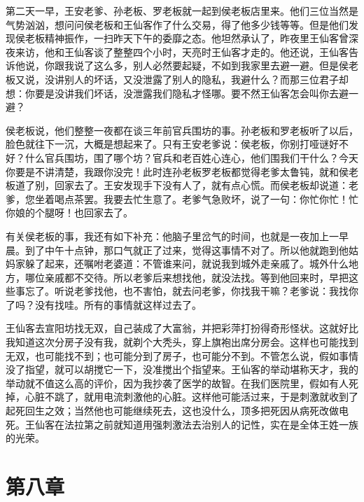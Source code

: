 第二天一早，王安老爹、孙老板、罗老板就一起到侯老板店里来。他们三位当然是气势汹汹，想问问侯老板和王仙客作了什么交易，得了他多少钱等等。但是他们发现侯老板精神振作，一扫昨天下午的委靡之态。他坦然承认了，昨夜里王仙客曾深夜来访，他和王仙客谈了整整四个小时，天亮时王仙客才走的。他还说，王仙客告诉他说，你跟我说了这么多，别人必然要起疑，不如到我家里去避一避。但是侯老板又说，没讲别人的坏话，又没泄露了别人的隐私，我避什么？而那三位君子却想：你要是没讲我们坏话，没泄露我们隐私才怪哪。要不然王仙客怎会叫你去避一避？ 

侯老板说，他们整整一夜都在谈三年前官兵围坊的事。孙老板和罗老板听了以后，脸色就往下一沉，大概是想起来了。只有王安老爹说：侯老板，你别打哑谜好不好？什么官兵围坊，围了哪个坊？官兵和老百姓心连心，他们围我们干什么？今天你要是不讲清楚，我跟你没完！此时连孙老板罗老板都觉得老爹太鲁钝，就和侯老板道了别，回家去了。王安发现手下没有人了，就有点心慌。而侯老板却说道：老爹，您坐着喝点茶罢。我要去忙生意了。老爹气急败坏，说了一句：你忙你忙！忙你娘的个腿呀！也回家去了。 

有关侯老板的事，我还有如下补充：他脑子里岔气的时间，也就是一夜加上一早晨。到了中午十点钟，那口气就正了过来，觉得这事情不对了。所以他就跑到他姑妈家躲了起来，还嘱咐老婆道：不管谁来问，就说我到城外走亲戚了。城外什么地方，哪位亲戚都不交待。所以老爹后来想找他，就没法找。等到他回来时，早把这些事忘了。听说老爹找他，也不害怕，就去问老爹，你找我干嘛？老爹说：我找你了吗？没有找哇。所有的事情就这样过去了。 

王仙客去宣阳坊找无双，自己装成了大富翁，并把彩萍打扮得奇形怪状。这就好比我知道这次分房子没有我，就剃个大秃头，穿上旗袍出席分房会。这样也可能找到无双，也可能找不到；也可能分到了房子，也可能分不到。不管怎么说，假如事情没了指望，就可以胡搅它一下，没准搅出个指望来。王仙客的举动堪称天才，我的举动就不值这么高的评价，因为我抄袭了医学的故智。在我们医院里，假如有人死掉，心脏不跳了，就用电流刺激他的心脏。这样他可能活过来，于是刺激就收到了起死回生之效；当然他也可能继续死去，这也没什么，顶多把死因从病死改做电死。王仙客在法拉第之前就知道用强刺激法去治别人的记性，实在是全体王姓一族的光荣。

\section{第八章}

